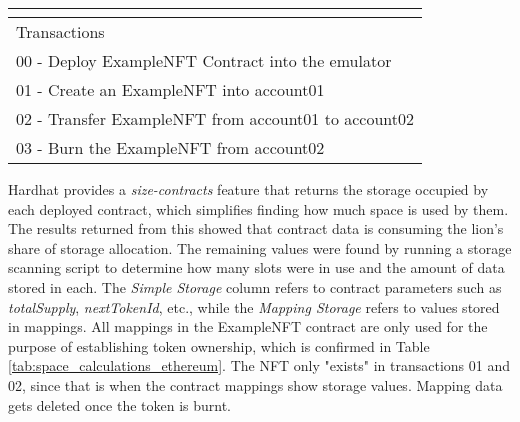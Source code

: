 \documentclass[../NFTComp_IEEE.tex]{subfiles}
\begin{document}
\begin{table}[ht]
{\begin{tabular}{ccccc}
            \multicolumn{1}{l}{}                               & \multicolumn{1}{l}{}                                                           & \multicolumn{1}{l}{}                         & \multicolumn{1}{l}{}                          & \multicolumn{1}{l}{}                        \\ \hline
            \multicolumn{5}{|l|}{Transactions}                                                                                                                                                                                                                                               \\ \hline
            \multicolumn{5}{|l|}{00 - Deploy ExampleNFT Contract into the emulator}                                                                                                                                                                                                          \\ \hline
            \multicolumn{5}{|l|}{01 - Create an ExampleNFT into account01}                                                                                                                                                                                                                   \\ \hline
            \multicolumn{5}{|l|}{02 - Transfer ExampleNFT from account01 to account02}                                                                                                                                                                                                       \\ \hline
            \multicolumn{5}{|l|}{03 - Burn the ExampleNFT from account02}                                                                                                                                                                                                                    \\ \hline
        \end{tabular}%
    }
\end{table}

Hardhat provides a \textit{size-contracts} feature that returns the storage occupied by each deployed contract, which simplifies finding how much space is used by them. The results returned from this showed that contract data is consuming the lion's share of storage allocation. The remaining values were found by running a storage scanning script to determine how many slots were in use and the amount of data stored in each. The \textit{Simple Storage} column refers to contract parameters such as \textit{totalSupply}, \textit{nextTokenId}, etc., while the \textit{Mapping Storage} refers to values stored in mappings. All mappings in the ExampleNFT contract are only used for the purpose of establishing token ownership, which is confirmed in Table \ref{tab:space_calculations_ethereum}. The NFT only "exists" in transactions 01 and 02, since that is when the contract mappings show storage values. Mapping data gets deleted once the token is burnt.
\end{document}
